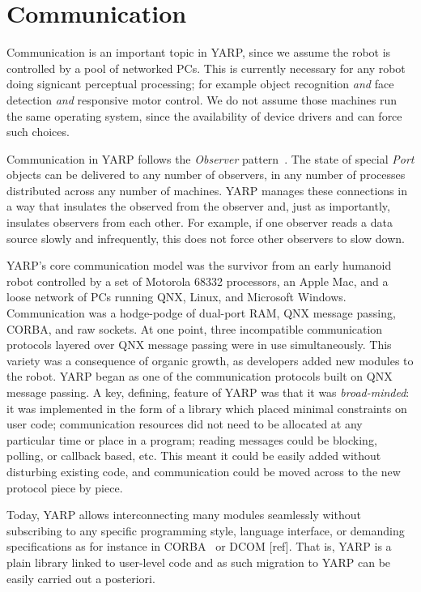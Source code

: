 \section{Communication}
\label{sec:communication}

Communication is an important topic in YARP, since
we assume the robot is controlled by a pool of networked PCs.  This is currently
necessary for any robot doing signicant perceptual processing; for
example object recognition {\em and} face detection {\em and}
responsive motor control.  We do not assume those machines run the
same operating system, since the availability of device drivers and
can force such choices.

Communication in YARP follows the {\em Observer} pattern~\cite{gamma95design}.  The state
of special {\it Port} objects can be delivered to any number of
observers, in any number of processes distributed across any number of
machines.  YARP manages these connections in a way that insulates
the observed from the observer and, just as importantly, insulates
observers from each other.  For example,
if one observer reads a data source slowly and infrequently, this
does not force other observers to slow down.

YARP's core communication model was the survivor from an early humanoid robot
controlled by
a set of Motorola 68332 processors, an Apple Mac, and a loose network
of PCs running QNX, Linux, and Microsoft Windows.  Communication was a
hodge-podge of dual-port RAM, QNX message passing, CORBA, and raw
sockets.  At one point, three incompatible communication protocols
layered over QNX message passing were in use simultaneously.  This
variety was a consequence of organic growth, as developers added new
modules to the robot.  YARP began as one of the communication
protocols built on QNX message passing.  A key, defining, feature of
YARP was that it was {\em broad-minded}: it was
implemented in the form of a library which placed minimal constraints
on user code; communication resources did not need to be allocated at
any particular time or place in a program; reading messages could be
blocking, polling, or callback based, etc. This meant it could be
easily added without disturbing existing code, and communication could
be moved across to the new protocol piece by piece.

%
Today,
YARP allows interconnecting many modules
seamlessly without subscribing to any specific programming style, language interface, 
or demanding specifications as for instance in CORBA~\cite{vinoski97corba} or DCOM [ref]. That is, YARP 
is a plain library linked to user-level code and as such migration to YARP can be easily
carried out a posteriori. 



